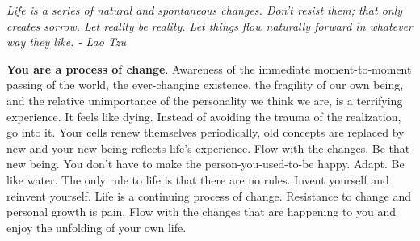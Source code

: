 \documentclass[a4paper,hidelinks]{article}
\begin{document}
\newpage

\begin{center}
\textit{
Life is a series of natural and spontaneous changes. Don't resist them; that only creates sorrow. Let reality be reality. Let things flow naturally forward in whatever way they like. - Lao Tzu
}
\end{center}

\textbf{You are a process of change}.
Awareness of the immediate moment-to-moment passing of the world, the ever-changing existence, the fragility of our own being, and the relative unimportance of the personality we think we are, is a terrifying experience.
It feels like dying.
Instead of avoiding the trauma of the realization, go into it.
Your cells renew themselves periodically, old concepts are replaced by new and your new being reflects life’s experience.
Flow with the changes.
Be that new being.
You don’t have to make the person-you-used-to-be happy.
Adapt.
Be like water.
The only rule to life is that there are no rules.
Invent yourself and reinvent yourself.
Life is a continuing process of change.
Resistance to change and personal growth is pain.
Flow with the changes that are happening to you and enjoy the unfolding of your own life.




\end{document}
